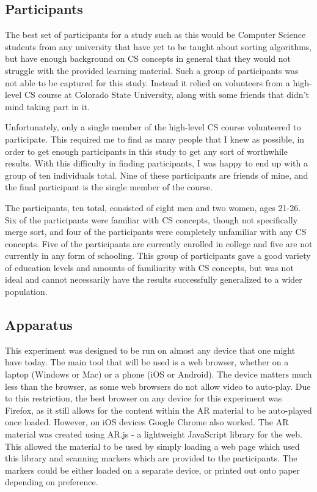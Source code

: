 \documentclass[sigconf]{acmart}
\begin{document}
\subsection{Participants}
The best set of participants for a study such as this would be Computer Science students from any university that have yet to be taught about sorting algorithms, but have enough background on CS concepts in general that they would not struggle with the provided learning material. Such a group of participants was not able to be captured for this study. Instead it relied on volunteers from a high-level CS course at Colorado State University, along with some friends that didn't mind taking part in it.

Unfortunately, only a single member of the high-level CS course volunteered to participate. This required me to find as many people that I knew as possible, in order to get enough participants in this study to get any sort of worthwhile results. With this difficulty in finding participants, I was happy to end up with a group of ten individuals total. Nine of these participants are friends of mine, and the final participant is the single member of the course.

The participants, ten total, consisted of eight men and two women, ages 21-26. Six of the participants were familiar with CS concepts, though not specifically merge sort, and four of the participants were completely unfamiliar with any CS concepts. Five of the participants are currently enrolled in college and five are not currently in any form of schooling. This group of participants gave a good variety of education levels and amounts of familiarity with CS concepts, but was not ideal and cannot necessarily have the results successfully generalized to a wider population.

\subsection{Apparatus}
This experiment was designed to be run on almost any device that one might have today. The main tool that will be used is a web browser, whether on a laptop (Windows or Mac) or a phone (iOS or Android). The device matters much less than the browser, as some web browsers do not allow video to auto-play. Due to this restriction, the best browser on any device for this experiment was Firefox, as it still allows for the content within the AR material to be auto-played once loaded. However, on iOS devices Google Chrome also worked. The AR material was created using AR.js - a lightweight JavaScript library for the web. This allowed the material to be used by simply loading a web page which used this library and scanning markers which are provided to the participants. The markers could be either loaded on a separate device, or printed out onto paper depending on preference.
\end{document}
